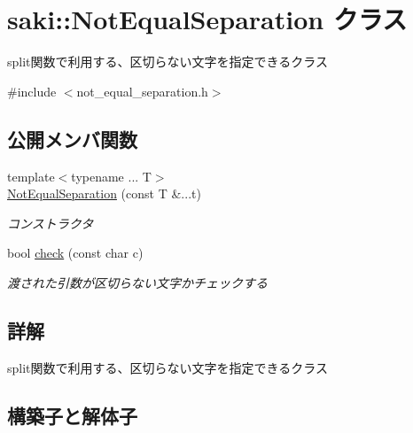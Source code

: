 \hypertarget{classsaki_1_1_not_equal_separation}{}\section{saki\+:\+:Not\+Equal\+Separation クラス}
\label{classsaki_1_1_not_equal_separation}


split関数で利用する、区切らない文字を指定できるクラス  




{\ttfamily \#include $<$not\+\_\+equal\+\_\+separation.\+h$>$}

\subsection*{公開メンバ関数}
\begin{DoxyCompactItemize}
\item 
{\footnotesize template$<$typename ... T$>$ }\\\mbox{\hyperlink{classsaki_1_1_not_equal_separation_a76a073717e7cdef404a9f5db0ea8d1c4}{Not\+Equal\+Separation}} (const T \&...t)
\begin{DoxyCompactList}\small\item\em コンストラクタ \end{DoxyCompactList}\item 
bool \mbox{\hyperlink{classsaki_1_1_not_equal_separation_ae0f0b0efa166ce1edcec289a8c04e549}{check}} (const char c)
\begin{DoxyCompactList}\small\item\em 渡された引数が区切らない文字かチェックする \end{DoxyCompactList}\end{DoxyCompactItemize}


\subsection{詳解}
split関数で利用する、区切らない文字を指定できるクラス 

\subsection{構築子と解体子}
\mbox{\label{classsaki_1_1_not_equal_separation_a76a073717e7cdef404a9f5db0ea8d1c4}} 
